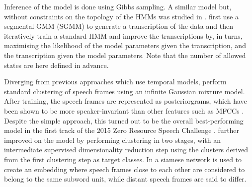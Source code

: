 Inference of the model is done using Gibbs sampling.
A similar model but, without constraints on the topology of the HMMs was studied in \parencite{gs:VanhainenAndSalvi2014ICASSP}.
\textcite{siu2014unsupervised} first use a segmental GMM (SGMM) to generate a transcription of the data and then iteratively train a standard HMM and improve the transcriptions by, in turns, maximising the likelihood of the model parameters given the transcription, and the transcription given the model parameters.
Note that the number of allowed states are here defined in advance.

Diverging from previous approaches which use temporal models, \textcite{chen2015parallel} perform standard clustering of speech frames using an infinite Gaussian mixture model.
After training, the speech frames are represented as posteriorgrams, which have been shown to be more speaker-invariant than other features such as MFCCs \parencite{zhang2010towards}.
Despite the simple approach, this turned out to be the overall best-performing model in the first track of the 2015 Zero Resource Speech Challenge \parencite{versteegh2016zero}.
\textcite{heck2016unsupervised} further improved on the model by performing clustering in two stages, with an intermediate supervised dimensionality reduction step using the clusters derived from the first clustering step as target classes.
In \parencite{synnaeve2016temporal} a siamese network \parencite{bromley1994signature} is used to create an embedding where speech frames close to each other are considered to belong to the same subword unit, while distant speech frames are said to differ.


